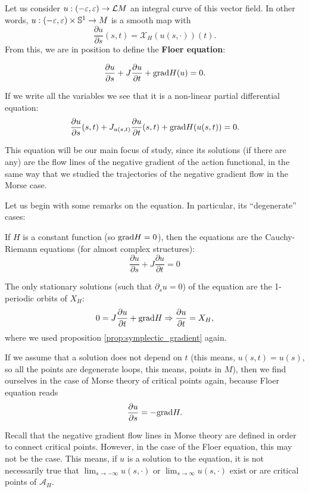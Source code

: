 Let us consider $u : (-\varepsilon,\varepsilon) \rightarrow \mathcal{L}M$ an integral curve of this vector field. In other words, $u : (-\varepsilon,\varepsilon) \times \mathbb{S}^1 \rightarrow M$ is a smooth map with
\[\frac{\partial u}{\partial s} (s,t) = \mathcal{X}_H(u(s,\cdot)) (t) .\]
From this, we are in position to define the {\bf Floer equation}:

\begin{equation} \label{equation:floer_equation}
\frac{\partial u}{\partial s} + J \frac{\partial u}{\partial t} + \mathrm{grad} H(u) = 0 .
\end{equation}

If we write all the variables we see that it is a non-linear partial differential equation:
\[\frac{\partial u}{\partial s}(s,t) + J_{u(s,t)} \frac{\partial u}{\partial t}(s,t) + \mathrm{grad} H(u(s,t)) = 0 .\]

This equation will be our main focus of study, since its solutions (if there are any) are the flow lines of the negative gradient of the action functional, in the same way that we studied the trajectories of the negative gradient flow in the Morse case.

Let us begin with some remarks on the equation. In particular, its “degenerate” cases:

\begin{rmrk}
If $H$ is a constant function (so $\mathrm{grad} H = 0$), then the equations are the Cauchy-Riemann equations (for almost complex structures):
\[\frac{\partial u}{\partial s} + J \frac{\partial u}{\partial t} = 0\]
\end{rmrk}

\begin{rmrk} \label{rmrk:floer_stationary}
The only stationary solutions (such that $\partial_s u = 0$) of the equation are the 1-periodic orbits of $X_H$:
\[0 = J \frac{\partial u}{\partial t} + \mathrm{grad} H \Rightarrow \frac{\partial u}{\partial t} = X_H ,\]
where we used proposition \ref{prop:symplectic_gradient} again.
\end{rmrk}

\begin{rmrk}
If we assume that a solution does not depend on $t$ (this means, $u(s,t) = u(s)$, so all the points are degenerate loops, this means, points in $M$), then we find ourselves in the case of Morse theory of critical points again, because Floer equation reads
\[\frac{\partial u}{\partial s} = - \mathrm{grad} H .\]
\end{rmrk}

Recall that the negative gradient flow lines in Morse theory are defined in order to connect critical points. However, in the case of the Floer equation, this may not be the case. This means, if $u$ is a solution to the equation, it is not necessarily true that $\displaystyle\lim_{s \rightarrow -\infty} u(s,\cdot)$ or $\displaystyle\lim_{s \rightarrow \infty} u(s,\cdot)$ exist or are critical points of $\mathcal{A}_H$.

